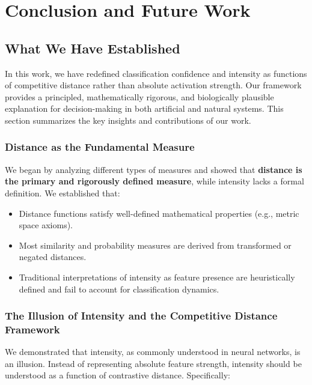 \documentclass[12pt]{article}
\begin{document}
\section{Conclusion and Future Work}
\subsection{What We Have Established}

In this work, we have redefined classification confidence and intensity as functions of competitive distance rather than absolute activation strength. Our framework provides a principled, mathematically rigorous, and biologically plausible explanation for decision-making in both artificial and natural systems. This section summarizes the key insights and contributions of our work.

\subsubsection{Distance as the Fundamental Measure}

We began by analyzing different types of measures and showed that \textbf{distance is the primary and rigorously defined measure}, while intensity lacks a formal definition. We established that:

\begin{itemize}
    \item Distance functions satisfy well-defined mathematical properties (e.g., metric space axioms).
    \item Most similarity and probability measures are derived from transformed or negated distances.
    \item Traditional interpretations of intensity as feature presence are heuristically defined and fail to account for classification dynamics.
\end{itemize}

\subsubsection{The Illusion of Intensity and the Competitive Distance Framework}

We demonstrated that intensity, as commonly understood in neural networks, is an illusion. Instead of representing absolute feature strength, intensity should be understood as a function of contrastive distance. Specifically:
\end{document}
